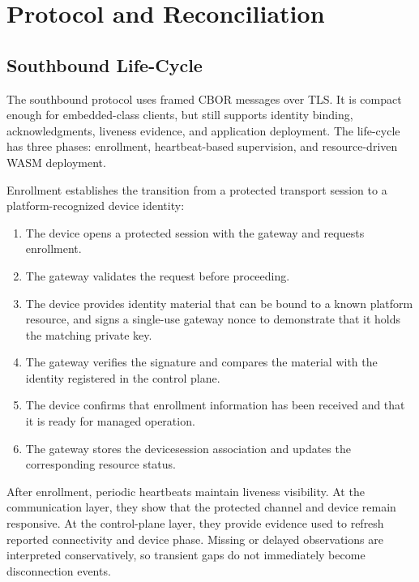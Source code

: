 \section{Protocol and Reconciliation}\label{sec:protocol}

\subsection{Southbound Life-Cycle}
The southbound protocol uses framed CBOR messages over TLS\@. It is compact enough for embedded-class clients, but still supports identity binding, acknowledgments, liveness evidence, and application deployment. The life-cycle has three phases: enrollment, heartbeat-based supervision, and resource-driven WASM deployment.

Enrollment establishes the transition from a protected transport session to a platform-recognized device identity:
\begin{enumerate}
    \item The device opens a protected session with the gateway and requests enrollment.
    \item The gateway validates the request before proceeding.
    \item The device provides identity material that can be bound to a known platform resource, and signs a single-use gateway nonce to demonstrate that it holds the matching private key.
    \item The gateway verifies the signature and compares the material with the identity registered in the control plane.
    \item The device confirms that enrollment information has been received and that it is ready for managed operation.
    \item The gateway stores the device\textendash{}session association and updates the corresponding resource status.
\end{enumerate}

After enrollment, periodic heartbeats maintain liveness visibility. At the communication layer, they show that the protected channel and device remain responsive. At the control-plane layer, they provide evidence used to refresh reported connectivity and device phase. Missing or delayed observations are interpreted conservatively, so transient gaps do not immediately become disconnection events.


